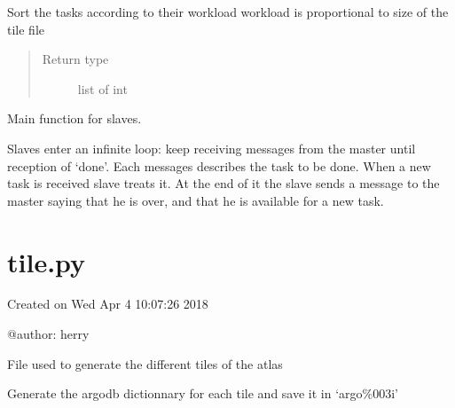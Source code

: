\documentclass[letterpaper,10pt,english]{sphinxmanual}
\begin{document}

\begin{fulllineitems}
\label{\detokenize{pargopy:pargopy.task_giver_stats.ordering_tasks}}
Sort the tasks according to their workload
workload is proportional to size of the tile file
\begin{quote}\begin{description}
\item[{Return type}] \leavevmode
list of int

\end{description}\end{quote}

\end{fulllineitems}


\begin{fulllineitems}
\label{\detokenize{pargopy:pargopy.task_giver_stats.slave_work_nonblocking}}
Main function for slaves.

Slaves enter an infinite loop: keep receiving messages from the
master until reception of ‘done’. Each messages describes the task
to be done. When a new task is received slave treats it. At the
end of it the slave sends a message to the master saying that he
is over, and that he is available for a new task.

\end{fulllineitems}



\section{tile.py}
\label{\detokenize{pargopy:module-pargopy.tile}}\label{\detokenize{pargopy:tile-py}}
Created on Wed Apr  4 10:07:26 2018

@author: herry

File used to generate the different tiles of the atlas

\begin{fulllineitems}
\label{\detokenize{pargopy:pargopy.tile.generate_argotiles}}
Generate the argodb dictionnary for each tile and save it in
‘argo\%003i’

\end{fulllineitems}
\end{document}
